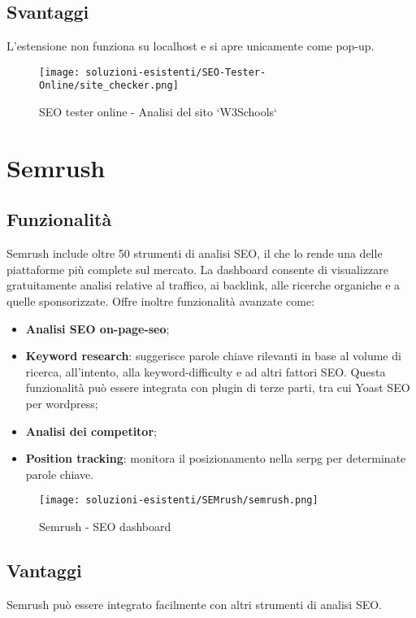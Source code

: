 \subsection{Svantaggi}
\par L'estensione non funziona su \gls{localhost} e si apre unicamente come pop-up.

\begin{figure}[H]
    \centering 
    \texttt{[image: soluzioni-esistenti/SEO-Tester-Online/site\_checker.png]} 
    \caption{SEO tester online - Analisi del sito `W3Schools`}
\end{figure}

\section{Semrush}

\subsection{Funzionalità}
\par Semrush include oltre 50 strumenti di analisi SEO, il che lo rende una delle piattaforme più complete sul mercato. La dashboard consente di visualizzare gratuitamente analisi relative al traffico, ai \gls{backlink}, alle ricerche \gls{organiche} e a quelle \gls{sponsorizzate}. Offre inoltre funzionalità avanzate come:
\begin{itemize}
    \item \textbf{Analisi SEO \gls{on-page-seo}};
    \item \textbf{Keyword research}: suggerisce parole chiave rilevanti in base al volume di ricerca, all'intento, alla \gls{keyword-difficulty} e ad altri fattori SEO. Questa funzionalità può essere integrata con plugin di terze parti, tra cui Yoast SEO per \gls{wordpress};
    \item \textbf{Analisi dei competitor};
    \item \textbf{Position tracking}: monitora il posizionamento nella \gls{serpg} per determinate parole chiave.
\end{itemize}

\begin{figure}[H] 
    \centering 
    \texttt{[image: soluzioni-esistenti/SEMrush/semrush.png]} 
    \caption{Semrush - SEO dashboard}
\end{figure}

\subsection{Vantaggi}
\par Semrush può essere integrato facilmente con altri strumenti di analisi SEO.

